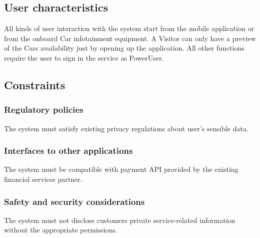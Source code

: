 \subsection{User characteristics}
All kinds of user interaction with the system start from the mobile application or from the onboard Car infotainment equipment. A Visitor can only have a preview of the Cars availability just by opening up the application. All other functions require the user to sign in the service as PowerUser.

\subsection{Constraints}
\subsubsection{Regulatory policies}
The system must satisfy existing privacy regulations about user's sensible data.
\subsubsection{Interfaces to other applications}
The system must be compatible with payment API provided by the existing financial services partner.
\subsubsection{Safety and security considerations}
The system must not disclose customers private service-related information without the appropriate permissions.

